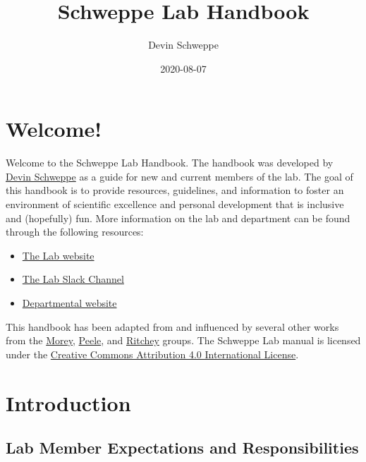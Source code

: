 \documentclass[
]{book}
\title{Schweppe Lab Handbook}
\author{Devin Schweppe}
\date{2020-08-07}
\providecommand{\tightlist}{%
  \setlength{\itemsep}{0pt}\setlength{\parskip}{0pt}}
\begin{document}
\maketitle

{
\setcounter{tocdepth}{1}
\tableofcontents
}
\hypertarget{welcome}{%
\chapter{Welcome!}\label{welcome}}

Welcome to the Schweppe Lab Handbook. The handbook was developed by \href{https://www.schweppelab.org/}{Devin Schweppe} as a guide for new and current members of the lab. The goal of this handbook is to provide resources, guidelines, and information to foster an environment of scientific excellence and personal development that is inclusive and (hopefully) fun. More information on the lab and department can be found through the following resources:

\begin{itemize}
\tightlist
\item
  \href{https://www.schweppelab.org}{The Lab website}
\item
  \href{https://schweppelab.slack.com/}{The Lab Slack Channel}
\item
  \href{https://www.gs.washington.edu/}{Departmental website}
\end{itemize}

This handbook has been adapted from and influenced by several other works from the \href{https://ccmorey.github.io/labHandbook/index.html}{Morey}, \href{https://github.com/jpeelle/peellelab_manual/blob/master/peellelab_manual.pdf}{Peele}, and \href{http://www.thememolab.org/resources/}{Ritchey} groups. The Schweppe Lab manual is licensed under the \href{https://creativecommons.org/licenses/by/4.0/}{Creative Commons Attribution 4.0 International License}.

\hypertarget{intro}{%
\chapter{Introduction}\label{intro}}

\hypertarget{lab-member-expectations-and-responsibilities}{%
\section{Lab Member Expectations and Responsibilities}\label{lab-member-expectations-and-responsibilities}}
\end{document}
